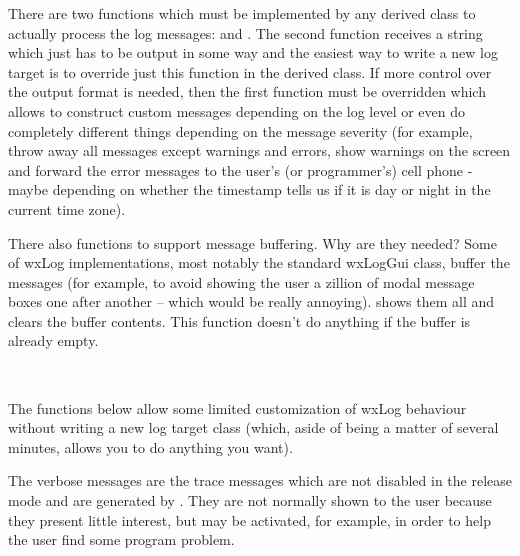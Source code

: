 \\
\\
\\
\\
\\


There are two functions which must be implemented by any derived class to
actually process the log messages:  and
. The second function receives a string
which just has to be output in some way and the easiest way to write a new log
target is to override just this function in the derived class. If more control
over the output format is needed, then the first function must be overridden
which allows to construct custom messages depending on the log level or even
do completely different things depending on the message severity (for example,
throw away all messages except warnings and errors, show warnings on the
screen and forward the error messages to the user's (or programmer's) cell
phone - maybe depending on whether the timestamp tells us if it is day or
night in the current time zone).

There also functions to support message buffering. Why are they needed?
Some of wxLog implementations, most notably the standard wxLogGui class,
buffer the messages (for example, to avoid showing the user a zillion of modal
message boxes one after another -- which would be really annoying).
 shows them all and clears the buffer contents.
This function doesn't do anything if the buffer is already empty.

\\

\label{wxlogcustomization}

The functions below allow some limited customization of wxLog behaviour
without writing a new log target class (which, aside of being a matter of
several minutes, allows you to do anything you want).

The verbose messages are the trace messages which are not disabled in the
release mode and are generated by . They
are not normally shown to the user because they present little interest, but
may be activated, for example, in order to help the user find some program
problem.

